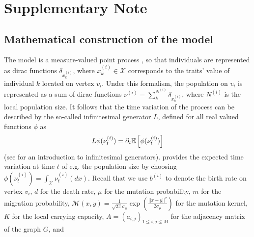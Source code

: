 \graphicspath{{./content/chap1_diff_in_graphs/figures/}}


\section{Supplementary Note}
    \label{secSI:supmat}

    \subsection{Mathematical construction of the model}\label{secSI:formal_descrip}
    The model is a measure-valued point process \citep{Bansaye2015}, so that individuals are represented as dirac functions $\delta_{x_{k}^{(i)}}$, where $x_{k}^{(i)} \in \mathcal{X}$ corresponds to the traits' value of individual $k$ located on vertex $v_i$.
    Under this formalism, the population on $v_i$ is represented as a sum of dirac functions $\nu^{(i)} = \sum^{N^{(i)}}_k \delta_{x_{k}^{(i)}}$, where $N^{(i)}$ is the local population size. 
    It follows that the time variation of the process can be described by the so-called infinitesimal generator $L$, defined for all real valued functions $\phi$ as
    \begin{equation}\label{eqSI:def_infgen}
         L \phi(\nu^{(i)}_t) = \partial_t {\mathbb{E}} \left[\phi(\nu^{(i)}_t) \right]
    \end{equation}
    (see \citep{Linke2015} for an introduction to infinitesimal generators).  provides the expected time variation at time $t$ of e.g. the population size by choosing $\phi(\nu^{(i)}_t) = \int_\mathcal{X} \nu^{(i)}_t(dx)$.
    Recall that we use
    $b^{(i)}$ to denote the birth rate on vertex $v_i$,
    $d$ for the death rate,
    $\mu$ for the mutation probability,
    $m$ for the migration probability,
    $\mathcal{M}(x,y) = \frac{1}{\sqrt{2\pi}\sigma_\mu} \exp \left(\frac{||x-y||^2}{2\sigma_\mu} \right)$ for the mutation kernel,
    $K$ for the local carrying capacity,
    $A = (a_{i,j})_{1\leq i, j \leq M}$ for the adjacency matrix of the graph $G$, and
